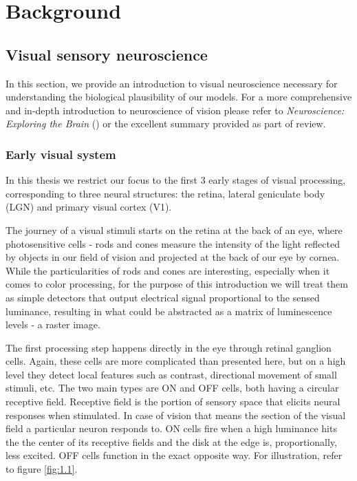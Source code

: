 \chapter{Background}\label{ch:1}

\section{Visual sensory neuroscience}
In this section, we provide an introduction to visual neuroscience necessary for understanding the biological plausibility of our models. For a more comprehensive and in-depth introduction to neuroscience of vision please refer to \textit{Neuroscience: Exploring the Brain} (\cite{bear_neuroscience:_2007}) or the excellent summary provided as part of \cite{Carandini10577} review.

\subsection{Early visual system}\label{ch:1.1.1}
In this thesis we restrict our focus to the first 3 early stages of visual processing, corresponding to three neural structures: the retina, lateral geniculate body (LGN) and primary visual cortex (V1).

The journey of a visual stimuli starts on the retina at the back of an eye, where photosensitive cells - rods and cones measure the intensity of the light reflected by objects in our field of vision and projected at the back of our eye by cornea. While the particularities of rods and cones are interesting, especially when it comes to color processing, for the purpose of this introduction we will treat them as simple detectors that output electrical signal proportional to the sensed luminance, resulting in what could be abstracted as a matrix of luminescence levels - a raster image. 

The first processing step happens directly in the eye through retinal ganglion cells. Again, these cells are more complicated than presented here, but on a high level they detect local features such as contrast, directional movement of small stimuli, etc. The two main types are ON and OFF cells, both having a circular receptive field. Receptive field is the portion of sensory space that elicits neural responses when stimulated. In case of vision that means the section of the visual field a particular neuron responds to. ON cells fire when a high luminance hits the the center of its receptive fields and the disk at the edge is, proportionally, less excited. OFF cells function in the exact opposite way. For illustration, refer to figure \ref{fig:1.1}.


